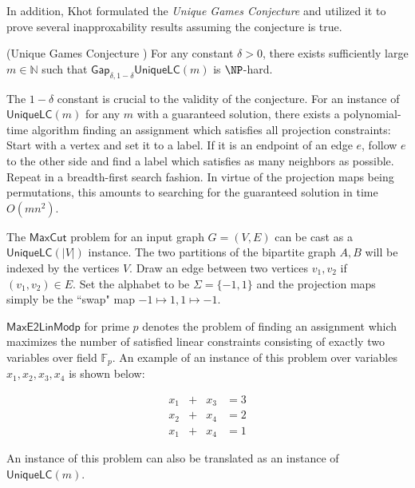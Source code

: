 In addition, Khot formulated the \emph{Unique Games Conjecture} and utilized it to prove several inapproxability results assuming the conjecture is true.

\begin{conjecture} (Unique Games Conjecture \cite{khot2002power})
  For any constant $\delta > 0$, there exists sufficiently large $m \in \mathbb{N}$ such that $\mathsf{Gap}_{\delta,1-\delta}\mathsf{UniqueLC}(m)$ is $\NP$-hard.
\end{conjecture}

\begin{remark}
  The $1-\delta$ constant is crucial to the validity of the conjecture. For an instance of $\mathsf{UniqueLC}(m)$ for any $m$ with a guaranteed solution, there exists a polynomial-time algorithm finding an assignment which satisfies all projection constraints: Start with a vertex and set it to a label. If it is an endpoint of an edge $e$, follow $e$ to the other side and find a label which satisfies as many neighbors as possible. Repeat in a breadth-first search fashion. In virtue of the projection maps being permutations, this amounts to searching for the guaranteed solution in time $O(mn^2)$.
\end{remark}

\begin{example}
  The $\mathsf{MaxCut}$ problem for an input graph $G = (V,E)$ can be cast as a $\mathsf{UniqueLC}(|V|)$ instance. The two partitions of the bipartite graph $A,B$ will be indexed by the vertices $V$. Draw an edge between two vertices $v_1,v_2$ if $(v_1,v_2) \in E$. Set the alphabet to be $\Sigma =\{-1,1\}$ and the projection maps simply be the ``swap" map $-1 \mapsto 1, 1 \mapsto -1$.
\end{example}

\begin{example}
  $\mathsf{MaxE2LinModp}$ for prime $p$ denotes the problem of finding an assignment which maximizes the number of satisfied linear constraints consisting of exactly two variables over field $\mathbb{F}_p$. An example of an instance of this problem over variables $x_1,x_2,x_3,x_4$ is shown below:

  \begin{equation*}
    \begin{alignedat}{3}
      x_1 & +{} & x_3 & = 3 \\
      x_2 & +{}  & x_4 & = 2 \\
      x_1 & +{} & x_4 & = 1
    \end{alignedat}
  \end{equation*}

  An instance of this problem can also be translated as an instance of $\mathsf{UniqueLC}(m)$.
\end{example}

